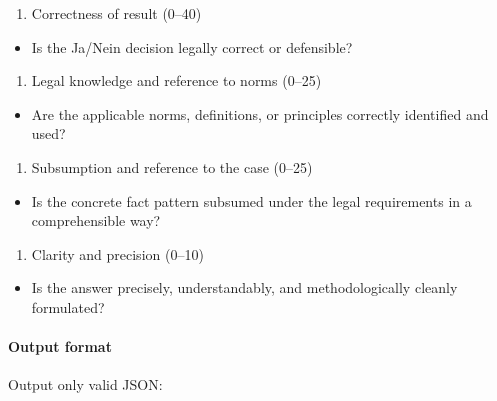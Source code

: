 \documentclass[11pt]{article}
\providecommand{\tightlist}{%
  \setlength{\itemsep}{0pt}\setlength{\parskip}{0pt}}
\begin{document}
\begin{enumerate}
\def\labelenumi{\arabic{enumi}.}
\tightlist
\item
  Correctness of result (0--40)
\end{enumerate}

\begin{itemize}
\tightlist
\item
  Is the Ja/Nein decision legally correct or defensible?
\end{itemize}

\begin{enumerate}
\def\labelenumi{\arabic{enumi}.}
\tightlist
\item
  Legal knowledge and reference to norms (0--25)
\end{enumerate}

\begin{itemize}
\tightlist
\item
  Are the applicable norms, definitions, or principles correctly
  identified and used?
\end{itemize}

\begin{enumerate}
\def\labelenumi{\arabic{enumi}.}
\tightlist
\item
  Subsumption and reference to the case (0--25)
\end{enumerate}

\begin{itemize}
\tightlist
\item
  Is the concrete fact pattern subsumed under the legal requirements in
  a comprehensible way?
\end{itemize}

\begin{enumerate}
\def\labelenumi{\arabic{enumi}.}
\tightlist
\item
  Clarity and precision (0--10)
\end{enumerate}

\begin{itemize}
\tightlist
\item
  Is the answer precisely, understandably, and methodologically cleanly
  formulated?
\end{itemize}

\paragraph{Output format}\label{output-format-2}

Output only valid JSON:
\end{document}
